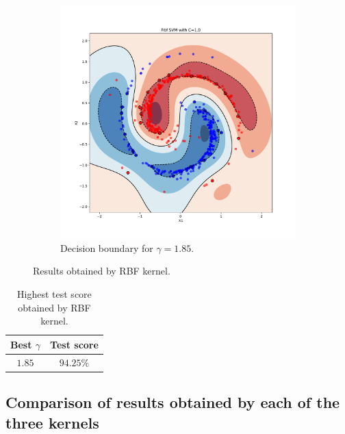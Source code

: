\documentclass{article}
\begin{document}
\begin{figure}[!ht]
\begin{subfigure}{0.8\textwidth}
\centering
\includegraphics[width=\textwidth]{./Figures/2c_bound_rbf}
\caption{Decision boundary for $\gamma=1.85$.}
\label{2_bound_rbf}
\end{subfigure}
\caption{Results obtained by RBF kernel.}
\end{figure}

\begin{table}[!ht]
\centering
\begin{tabular}{|c|c|} \hline
Best $\gamma$ & Test score \\ \hline
$1.85$ & $94.25\%$\\ \hline
\end{tabular}
\caption{Highest test score obtained by RBF kernel.}
\label{2_best_rbf}
\end{table}

\subsection{Comparison of results obtained by each of the three kernels}
\end{document}
